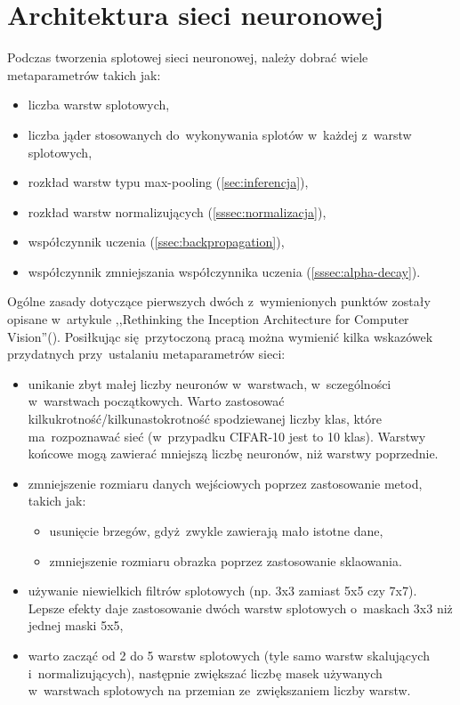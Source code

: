 \chapter{Architektura sieci neuronowej}
Podczas tworzenia splotowej sieci neuronowej, należy dobrać wiele metaparametrów takich jak:
\begin{itemize}
    \item liczba warstw splotowych,
    \item liczba jąder stosowanych do~wykonywania splotów w~każdej z~warstw splotowych,
    \item rozkład warstw typu max-pooling (\ref{sec:inferencja}),
    \item rozkład warstw normalizujących (\ref{sssec:normalizacja}),
    \item współczynnik uczenia (\ref{ssec:backpropagation}),
    \item współczynnik zmniejszania współczynnika uczenia (\ref{sssec:alpha-decay}).
\end{itemize}

Ogólne zasady dotyczące pierwszych dwóch z~wymienionych punktów zostały opisane w~artykule
,,Rethinking the Inception Architecture for Computer Vision''(\cite{RIACV}). Posiłkując się~przytoczoną pracą można
wymienić kilka wskazówek przydatnych przy~ustalaniu metaparametrów sieci:
\begin{itemize}
    \item unikanie zbyt małej liczby neuronów w~warstwach, w~sczególności w~warstwach początkowych. Warto zastosować
          kilkukrotność/kilkunastokrotność spodziewanej liczby klas, które ma~rozpoznawać sieć
          (w~przypadku CIFAR-10 jest to 10 klas). Warstwy końcowe mogą zawierać mniejszą liczbę neuronów, niż warstwy
          poprzednie.
    \item zmniejszenie rozmiaru danych wejściowych poprzez zastosowanie metod, takich jak:
          \begin{itemize}
              \item usunięcie brzegów, gdyż~zwykle zawierają mało istotne dane,
              \item zmniejszenie rozmiaru obrazka poprzez zastosowanie sklaowania.
          \end{itemize}
    \item używanie niewielkich filtrów splotowych (np. 3x3 zamiast 5x5 czy 7x7). Lepsze efekty daje zastosowanie dwóch
          warstw splotowych o~maskach 3x3 niż jednej maski 5x5,
    \item warto zacząć od 2 do 5 warstw splotowych (tyle samo warstw skalujących i~normalizujących), następnie zwiększać
          liczbę masek używanych w~warstwach splotowych na przemian ze~zwiększaniem liczby warstw.
\end{itemize}

